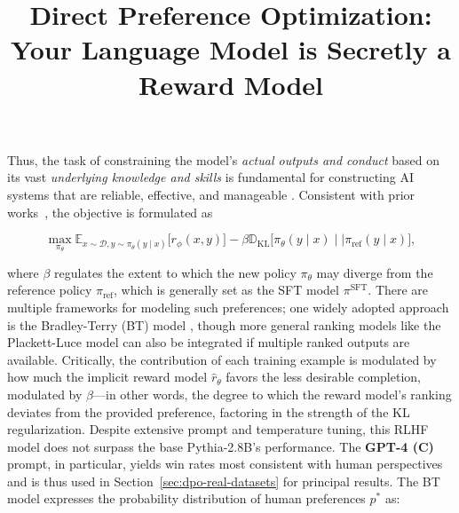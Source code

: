 \title{Direct Preference Optimization: Your Language Model is Secretly a Reward Model}
Thus, the task of constraining the model’s \emph{actual outputs and conduct} based on its vast \textit{underlying knowledge and skills} is fundamental for constructing AI systems that are reliable, effective, and manageable \citep{ouyang2022training}. Consistent with prior works~\citep{jaques2017sequence, jaques2020human}, the objective is formulated as

\begin{equation}\label{eq:RL}
\max_{\pi_{\theta}}  \mathbb{E}_{x\sim \mathcal{D}, y\sim \pi_{\theta}(y \mid x)}\bigl[r_{\phi}(x, y)\bigr] - \beta\mathbb{D}_{\textrm{KL}}\bigl[\pi_{\theta}(y\mid x)\mid \mid \pi_\text{ref}(y\mid x)\bigr],
\end{equation}

where $\beta$ regulates the extent to which the new policy $\pi_\theta$ may diverge from the reference policy $\pi_\text{ref}$, which is generally set as the SFT model $\pi^\text{SFT}$. There are multiple frameworks for modeling such preferences; one widely adopted approach is the Bradley-Terry (BT) model \cite{bradley1952rankanalysis}, though more general ranking models like the Plackett-Luce model \citep{plackett1975analysis, luce2012individual} can also be integrated if multiple ranked outputs are available. Critically, the contribution of each training example is modulated by how much the implicit reward model $\hat{r}_\theta$ favors the less desirable completion, modulated by $\beta$—in other words, the degree to which the reward model's ranking deviates from the provided preference, factoring in the strength of the KL regularization. Despite extensive prompt and temperature tuning, this RLHF model does not surpass the base Pythia-2.8B's performance. The \textbf{GPT-4 (C)} prompt, in particular, yields win rates most consistent with human perspectives and is thus used in Section~\ref{sec:dpo-real-datasets} for principal results. The BT model expresses the probability distribution of human preferences $p^*$ as:

